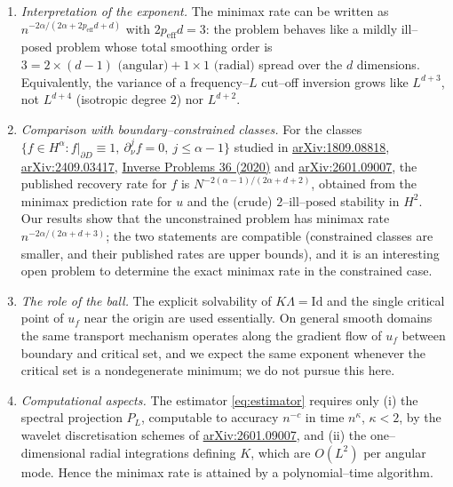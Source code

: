 \documentclass[11pt]{article}
\newcommand{\1}{\mathbf{1}}
\begin{document}
\begin{enumerate}
\item \emph{Interpretation of the exponent.} The minimax rate can be written as
$n^{-2\alpha/(2\alpha+2p_{\mathrm{eff}}d+d)}$ with $2p_{\mathrm{eff}}d=3$: the problem
behaves like a mildly ill--posed problem whose total smoothing order is $3=2\times(d-1)
\text{ (angular)}+1\times1\text{ (radial)}$ spread over the $d$ dimensions. Equivalently,
the variance of a frequency--$L$ cut--off inversion grows like $L^{d+3}$, not
$L^{d+4}$ (isotropic degree $2$) nor $L^{d+2}$.

\item \emph{Comparison with boundary--constrained classes.} For the classes
$\{f\in H^\alpha: f|_{\partial D}\equiv1,\ \partial_\nu^jf=0,\ j\le\alpha-1\}$
studied in
\href{https://export.arxiv.org/pdf/1809.08818v3.pdf}{arXiv:1809.08818},
\href{https://arxiv.org/html/2409.03417}{arXiv:2409.03417},
\href{https://google.iopscience.iop.org/article/10.1088/1361-6420/ab7d2a}{Inverse Problems 36 (2020)}
and \href{https://arxiv.org/html/2601.09007}{arXiv:2601.09007}, the published recovery
rate for $f$ is $N^{-2(\alpha-1)/(2\alpha+d+2)}$, obtained from the minimax prediction
rate for $u$ and the (crude) $2$--ill--posed stability in $H^2$. Our results show that
the unconstrained problem has minimax rate $n^{-2\alpha/(2\alpha+d+3)}$; the two
statements are compatible (constrained classes are smaller, and their published rates
are upper bounds), and it is an interesting open problem to determine the exact minimax
rate in the constrained case.

\item \emph{The role of the ball.} The explicit solvability of $K\Lambda=\mathrm{Id}$
and the single critical point of $u_f$ near the origin are used essentially. On general
smooth domains the same transport mechanism operates along the gradient flow of $u_f$
between boundary and critical set, and we expect the same exponent whenever the critical
set is a nondegenerate minimum; we do not pursue this here.

\item \emph{Computational aspects.} The estimator \eqref{eq:estimator} requires only
(i) the spectral projection $P_L$, computable to accuracy $n^{-c}$ in time
$n^{\kappa}$, $\kappa<2$, by the wavelet discretisation schemes of
\href{https://arxiv.org/html/2601.09007}{arXiv:2601.09007}, and (ii) the one--dimensional
radial integrations defining $K$, which are $O(L^2)$ per angular mode. Hence the
minimax rate is attained by a polynomial--time algorithm.
\end{enumerate}
\end{document}
